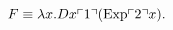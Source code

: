 \begin{solution}
    $$F\equiv \lambda x.Dx\ulcorner{1}\urcorner(\mathrm{Exp}\ulcorner{2}\urcorner x).$$
\end{solution}